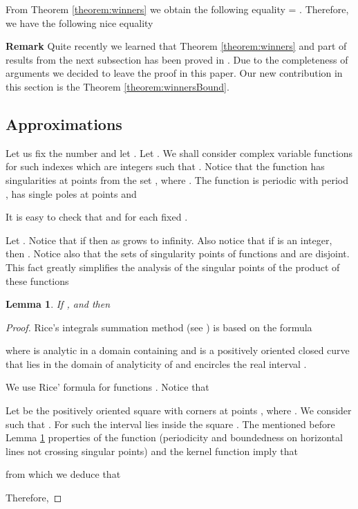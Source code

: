 \documentclass[proceedings]{dmtcs}
\newtheorem{lemma}{Lemma}
\begin{document}
From Theorem \ref{theorem:winners} we obtain the following equality  = .
Therefore, we have the following nice equality
 
\textbf{Remark} Quite recently we learned that Theorem \ref{theorem:winners} and part of results from the next subsection has been proved in \cite{kirschenhofer1996}. 
Due to the completeness of arguments we decided to leave the proof in this paper. 
Our new contribution in this section is the  Theorem \ref{theorem:winnersBound}.

\subsection{Approximations}

Let us fix the number  and let .
Let . We shall consider complex variable functions  for such indexes  
which are integers such that .
Notice that the function  has singularities at points from the set ,
where . 
The function  is periodic with period ,
has single poles at points  and

It is easy to check  that  and
 for each fixed .

Let . Notice that if  then  
as  grows to infinity.  Also notice that if  is an integer, then 
.
Notice also that the sets of singularity points of functions  and  are disjoint.
This fact greatly simplifies the analysis of the singular points of the product of these functions

\begin{lemma} 
\label{lemma:afterRice}
If ,  and  then

\end{lemma} 

\begin{proof}
Rice's integrals summation method (see \cite{Knuth:1998:ACP:280635}) is based on the formula
  
where  is analytic in a domain containing  and
 is a positively oriented closed curve that lies in the domain of analyticity of  and
encircles the real interval . 

We use Rice' formula for functions . 
Notice that


Let  be the positively oriented square with corners at points
, where . We consider such  that
. For such  the interval  lies inside the square . 
The mentioned before Lemma \ref{lemma:afterRice} properties of the function  
(periodicity and boundedness on horizontal lines not crossing singular points) and the kernel function  imply that
 
from which we deduce that

Therefore,

\end{proof}
\end{document}
